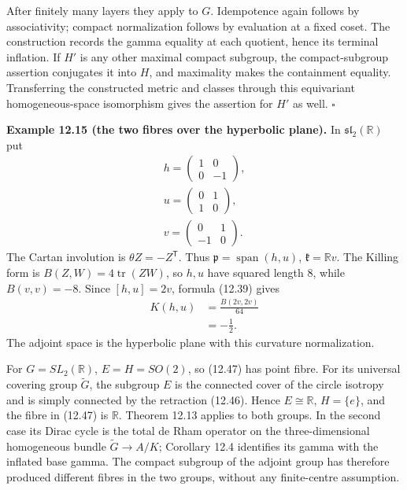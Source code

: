 \documentclass[
  11pt,
]{article}
\begin{document}
After finitely many layers they apply to \(G\). Idempotence again
follows by associativity; compact normalization follows by evaluation at
a fixed coset. The construction records the gamma equality at each
quotient, hence its terminal inflation. If \(H'\) is any other maximal
compact subgroup, the compact-subgroup assertion conjugates it into
\(H\), and maximality makes the containment equality. Transferring the
constructed metric and classes through this equivariant
homogeneous-space isomorphism gives the assertion for \(H'\) as well.
\(\square\)

\textbf{Example 12.15 (the two fibres over the hyperbolic plane).} In
\(\mathfrak{sl}_2(\mathbb R)\) put \[
\begin{gathered}
h=\begin{pmatrix}1&0\\0&-1\end{pmatrix},\\
u=\begin{pmatrix}0&1\\1&0\end{pmatrix},\\
v=\begin{pmatrix}0&1\\-1&0\end{pmatrix}.
\end{gathered}
\tag{12.49}
\] The Cartan involution is \(\theta Z=-Z^{\mathsf T}\). Thus
\(\mathfrak p=\operatorname{span}(h,u)\), \(\mathfrak k=\mathbb Rv\).
The Killing form is \(B(Z,W)=4\operatorname{tr}(ZW)\), so \(h,u\) have
squared length \(8\), while \(B(v,v)=-8\). Since \([h,u]=2v\), formula
(12.39) gives \[
\begin{aligned}
K(h,u)&=\frac{B(2v,2v)}{64}\\
&=-\tfrac12.
\end{aligned}
\tag{12.50}
\] The adjoint space is the hyperbolic plane with this curvature
normalization.

For \(G=SL_2(\mathbb R)\), \(E=H=SO(2)\), so (12.47) has point fibre.
For its universal covering group \(\widetilde G\), the subgroup \(E\) is
the connected cover of the circle isotropy and is simply connected by
the retraction (12.46). Hence \(E\cong\mathbb R\), \(H=\{e\}\), and the
fibre in (12.47) is \(\mathbb R\). Theorem 12.13 applies to both groups.
In the second case its Dirac cycle is the total de Rham operator on the
three-dimensional homogeneous bundle \(\widetilde G\to A/K\); Corollary
12.4 identifies its gamma with the inflated base gamma. The compact
subgroup of the adjoint group has therefore produced different fibres in
the two groups, without any finite-centre assumption.
\end{document}
